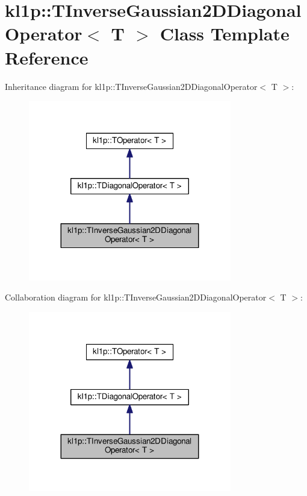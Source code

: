 \hypertarget{classkl1p_1_1TInverseGaussian2DDiagonalOperator}{}\section{kl1p\+:\+:T\+Inverse\+Gaussian2\+D\+Diagonal\+Operator$<$ T $>$ Class Template Reference}
\label{classkl1p_1_1TInverseGaussian2DDiagonalOperator}


Inheritance diagram for kl1p\+:\+:T\+Inverse\+Gaussian2\+D\+Diagonal\+Operator$<$ T $>$\+:
\nopagebreak
\begin{figure}[H]
\begin{center}
\leavevmode
\includegraphics[width=251pt]{classkl1p_1_1TInverseGaussian2DDiagonalOperator__inherit__graph}
\end{center}
\end{figure}


Collaboration diagram for kl1p\+:\+:T\+Inverse\+Gaussian2\+D\+Diagonal\+Operator$<$ T $>$\+:
\nopagebreak
\begin{figure}[H]
\begin{center}
\leavevmode
\includegraphics[width=251pt]{classkl1p_1_1TInverseGaussian2DDiagonalOperator__coll__graph}
\end{center}
\end{figure}

